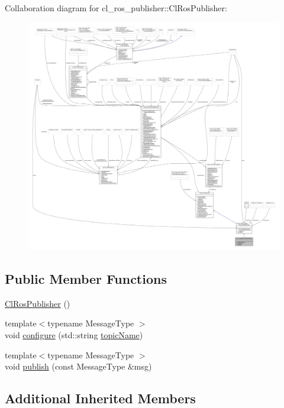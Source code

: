 Collaboration diagram for cl\+\_\+ros\+\_\+publisher\+:\+:Cl\+Ros\+Publisher\+:
\nopagebreak
\begin{figure}[H]
\begin{center}
\leavevmode
\includegraphics[width=350pt]{classcl__ros__publisher_1_1ClRosPublisher__coll__graph}
\end{center}
\end{figure}
\subsection*{Public Member Functions}
\begin{DoxyCompactItemize}
\item 
\hyperlink{classcl__ros__publisher_1_1ClRosPublisher_ab38e361d6b62f6ad19c2c9fd05101e50}{Cl\+Ros\+Publisher} ()
\item 
{\footnotesize template$<$typename Message\+Type $>$ }\\void \hyperlink{classcl__ros__publisher_1_1ClRosPublisher_a288bed7979e04a640a52980d50f3d7ec}{configure} (std\+::string \hyperlink{classsmacc_1_1client__bases_1_1SmaccPublisherClient_a8b8d98aef9b3b3a441005d2cb17b4fcc}{topic\+Name})
\item 
{\footnotesize template$<$typename Message\+Type $>$ }\\void \hyperlink{classcl__ros__publisher_1_1ClRosPublisher_a3517d62fb0703a0a72efe6de7ad1a6d8}{publish} (const Message\+Type \&msg)
\end{DoxyCompactItemize}
\subsection*{Additional Inherited Members}


